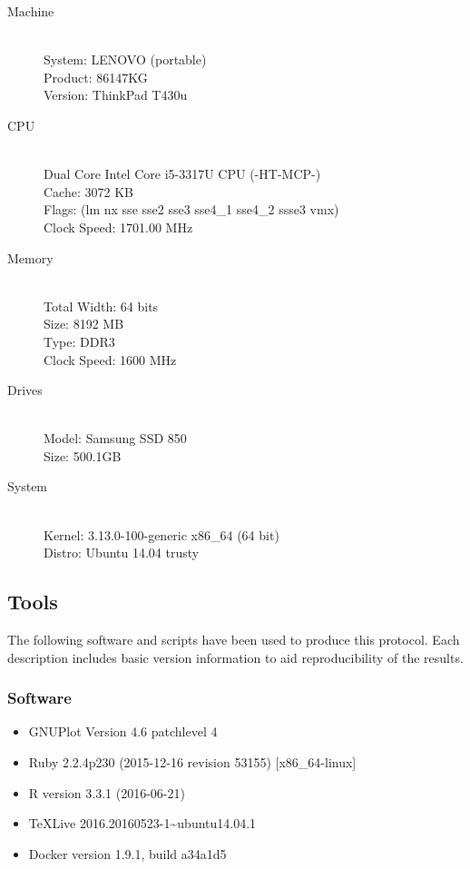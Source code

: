 \documentclass[a4paper,12pt]{article}
\begin{document}
\begin{description}
    \item[Machine] \hfill \\
    System: LENOVO (portable) \\
    Product: 86147KG \\
    Version: ThinkPad T430u

    \item[CPU] \hfill \\
    Dual Core Intel Core i5-3317U CPU (-HT-MCP-) \\
    Cache: 3072 KB \\
    Flags: (lm nx sse sse2 sse3 sse4\_1 sse4\_2 ssse3 vmx) \\
    Clock Speed: 1701.00 MHz

    \item[Memory] \hfill \\
    Total Width: 64 bits \\
    Size: 8192 MB \\
    Type: DDR3 \\
    Clock Speed: 1600 MHz

    \item[Drives] \hfill \\
    Model: Samsung SSD 850 \\
    Size: 500.1GB

    \item[System] \hfill \\
    Kernel: 3.13.0-100-generic x86\_64 (64 bit) \\
    Distro: Ubuntu 14.04 trusty \\
\end{description}

\subsection{Tools}

The following software and scripts have been used to produce this protocol. Each description
includes basic version information to aid reproducibility of the results.

\subsubsection{Software}
\begin{itemize}
    \item GNUPlot Version 4.6 patchlevel 4
    \item Ruby 2.2.4p230 (2015-12-16 revision 53155) [x86\_64-linux]
    \item R version 3.3.1 (2016-06-21)
    \item TeXLive 2016.20160523-1\~{}ubuntu14.04.1
    \item Docker version 1.9.1, build a34a1d5
\end{itemize}
\end{document}
